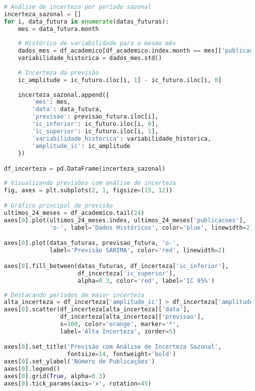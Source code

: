 \begin{pythonbox}
\begin{lstlisting}[language=Python]
# Análise de incerteza por período sazonal
incerteza_sazonal = []
for i, data_futura in enumerate(datas_futuras):
    mes = data_futura.month
    
    # Histórico de variabilidade para o mesmo mês
    dados_mes = df_academico[df_academico.index.month == mes]['publicacoes']
    variabilidade_historica = dados_mes.std()
    
    # Incerteza da previsão
    ic_amplitude = ic_futuro.iloc[i, 1] - ic_futuro.iloc[i, 0]
    
    incerteza_sazonal.append({
        'mes': mes,
        'data': data_futura,
        'previsao': previsao_futura.iloc[i],
        'ic_inferior': ic_futuro.iloc[i, 0],
        'ic_superior': ic_futuro.iloc[i, 1],
        'variabilidade_historica': variabilidade_historica,
        'amplitude_ic': ic_amplitude
    })

df_incerteza = pd.DataFrame(incerteza_sazonal)
\end{lstlisting}
\end{pythonbox}

\begin{pythonbox}
\begin{lstlisting}[language=Python]
# Visualizando previsões com análise de incerteza
fig, axes = plt.subplots(2, 1, figsize=(15, 12))

# Gráfico principal de previsão
ultimos_24_meses = df_academico.tail(24)
axes[0].plot(ultimos_24_meses.index, ultimos_24_meses['publicacoes'], 
             'o-', label='Dados Históricos', color='blue', linewidth=2)

axes[0].plot(datas_futuras, previsao_futura, 'o-', 
             label='Previsão SARIMA', color='red', linewidth=2)

axes[0].fill_between(datas_futuras, df_incerteza['ic_inferior'], 
                     df_incerteza['ic_superior'], 
                     alpha=0.3, color='red', label='IC 95%')
\end{lstlisting}
\end{pythonbox}

\begin{pythonbox}
\begin{lstlisting}[language=Python]
# Destacando períodos de maior incerteza
alta_incerteza = df_incerteza['amplitude_ic'] > df_incerteza['amplitude_ic'].median()
axes[0].scatter(df_incerteza[alta_incerteza]['data'], 
                df_incerteza[alta_incerteza]['previsao'],
                s=100, color='orange', marker='*', 
                label='Alta Incerteza', zorder=5)

axes[0].set_title('Previsão com Análise de Incerteza Sazonal', 
                  fontsize=14, fontweight='bold')
axes[0].set_ylabel('Número de Publicações')
axes[0].legend()
axes[0].grid(True, alpha=0.3)
axes[0].tick_params(axis='x', rotation=45)
\end{lstlisting}
\end{pythonbox}

